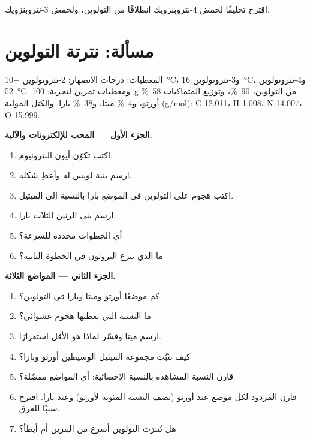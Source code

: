 \begin{exercise}[$\star\star\star$]\label{exo:b2:aromatic-substitution:12}
اقترح تخليقًا لحمض 4-نتروبنزويك انطلاقًا من التولوين، ولحمض 3-نتروبنزويك.
\end{exercise}

\section{مسألة: نترتة التولوين}

\begin{problem}
\label{pb:b2:aromatic-substitution:1}
المعطيات: درجات الانصهار: 2-نتروتولوين \qty{-10}{\degreeCelsius}، و3-نتروتولوين
\qty{16}{\degreeCelsius}، و4-نتروتولوين \qty{52}{\degreeCelsius}. ومعطيات تمرين لتجربة:
\qty{100}{g} من التولوين،  90~\%، وتوزيع المتماكبات 58~\% أورثو، و4~\% ميتا، 
و38~\% بارا. والكتل المولية (\unit{g/mol}): C 12.011، H 1.008، N 14.007، O 15.999.

\medskip
\noindent\textbf{الجزء الأول --- المحب للإلكترونات والآلية.}
\begin{enumerate}
  \item اكتب تكوّن أيون النترونيوم.
  \item ارسم بنية لويس له وأعطِ شكله.
  \item اكتب هجوم  على التولوين في الموضع بارا بالنسبة إلى الميثيل.
  \item ارسم بنى الرنين الثلاث  بارا.
  \item أي الخطوات محددة للسرعة؟
  \item ما الذي ينزع البروتون في الخطوة الثانية؟
\end{enumerate}

\medskip
\noindent\textbf{الجزء الثاني --- المواضع الثلاثة.}
\begin{enumerate}[resume]
  \item كم موضعًا أورثو وميتا وبارا في التولوين؟
  \item ما النسبة التي يعطيها هجوم عشوائي؟
  \item ارسم  ميتا وفسّر لماذا هو الأقل استقرارًا.
  \item كيف تثبّت مجموعة الميثيل الوسيطين أورثو وبارا؟
  \item قارن النسبة المشاهدة بالنسبة الإحصائية: أي المواضع مفضّلة؟
  \item قارن المردود لكل موضع عند أورثو (نصف النسبة المئوية لأورثو) وعند بارا.
        اقترح سببًا للفرق.
  \item هل تُنترَت التولوين أسرع من البنزين أم أبطأ؟
\end{enumerate}


\end{problem}
